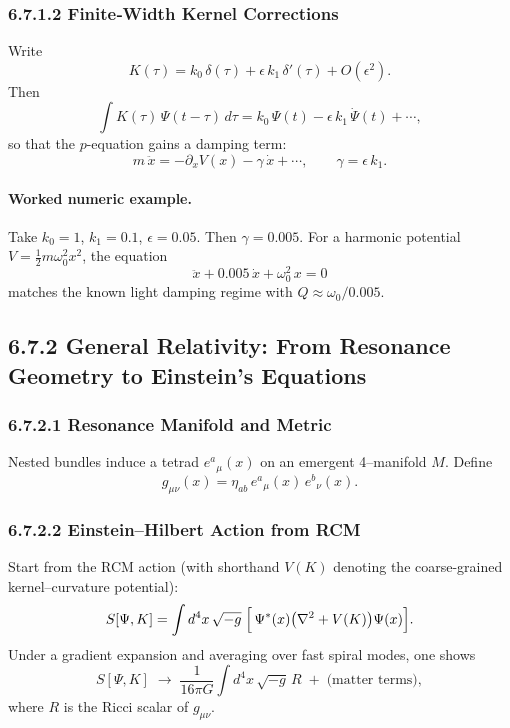 \subsubsection*{6.7.1.2 Finite‐Width Kernel Corrections}

Write
\[
K(\tau)
= k_0\,\delta(\tau)
+ \epsilon\,k_1\,\delta'(\tau)
+ O(\epsilon^2).
\]
Then
\[
\int K(\tau)\,\Psi(t-\tau)\,d\tau
= k_0\,\Psi(t)
- \epsilon\,k_1\,\dot\Psi(t)
+ \cdots,
\]
so that the \(p\)-equation gains a damping term:
\[
m\,\ddot x
= -\partial_xV(x) - \gamma\,\dot x + \cdots,
\qquad
\gamma = \epsilon\,k_1.
\]
\null\vspace{-1ex}
\paragraph{Worked numeric example.}
Take \(k_0=1\), \(k_1=0.1\), \(\epsilon=0.05\).  Then \(\gamma=0.005\).  For a harmonic potential \(V=\tfrac12m\omega_0^2x^2\), the equation
\[
\ddot x + 0.005\,\dot x + \omega_0^2\,x = 0
\]
matches the known light damping regime with \(Q\approx\omega_0/0.005\).

\medskip

\subsection{6.7.2 General Relativity: From Resonance Geometry to Einstein’s Equations}

\subsubsection*{6.7.2.1 Resonance Manifold and Metric}

Nested bundles induce a tetrad \(e^a{}_\mu(x)\) on an emergent 4–manifold \(M\).  Define
\[
g_{\mu\nu}(x)
= \eta_{ab}\,e^a{}_\mu(x)\,e^b{}_\nu(x).
\]

\subsubsection*{6.7.2.2 Einstein–Hilbert Action from RCM}

Start from the RCM action (with shorthand \(V(K)\) denoting the coarse-grained kernel–curvature potential):
\[
S[\Psi,K]
= \int d^4x\,\sqrt{-g}\;
\Bigl[\,
\Psi^*(x)\bigl(\nabla^2 + V(K)\bigr)\Psi(x)
\Bigr].
\]
Under a gradient expansion and averaging over fast spiral modes, one shows
\[
S[\Psi,K]\;\to\;
\frac{1}{16\pi G}\int d^4x\,\sqrt{-g}\,R
\;+\;\text{(matter terms)},
\]
where \(R\) is the Ricci scalar of \(g_{\mu\nu}\).

